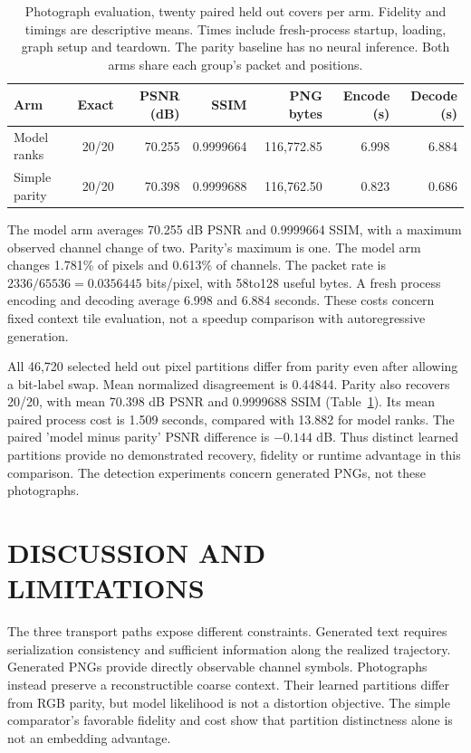 \documentclass[a4paper,twoside]{article}
\begin{document}
\begin{table}[t]
\caption{Photograph evaluation, twenty paired held out covers per arm. Fidelity and timings are descriptive means. Times include fresh-process startup, loading, graph setup and teardown. The parity baseline has no neural inference. Both arms share each group's packet and positions.}
\label{tab:cover}\centering\small
\begin{tabularx}{\textwidth}{@{}lrrrrrr@{}}
\toprule
Arm & Exact & PSNR (dB) & SSIM & PNG bytes & Encode (s) & Decode (s)\\
\midrule
Model ranks & 20/20 & 70.255 & 0.9999664 & 116,772.85 & 6.998 & 6.884\\
Simple parity & 20/20 & 70.398 & 0.9999688 & 116,762.50 & 0.823 & 0.686\\
\bottomrule
\end{tabularx}
\space
\end{table}

The model arm averages 70.255 dB PSNR and 0.9999664 SSIM, with a maximum observed channel change of two. Parity's maximum is one. The model arm changes 1.781\% of pixels and 0.613\% of channels. The packet rate is $2336/65536=0.0356445$ bits/pixel, with 58to128 useful bytes. A fresh process encoding and decoding average 6.998 and 6.884 seconds. These costs concern fixed context tile evaluation, not a speedup comparison with autoregressive generation.

All 46,720 selected held out pixel partitions differ from parity even after allowing a bit-label swap. Mean normalized disagreement is 0.44844. Parity also recovers 20/20, with mean 70.398 dB PSNR and 0.9999688 SSIM (Table~\ref{tab:cover}). Its mean paired process cost is 1.509 seconds, compared with 13.882 for model ranks. The paired 'model minus parity' PSNR difference is $-0.144$ dB. Thus distinct learned partitions provide no demonstrated recovery, fidelity or runtime advantage in this comparison. The detection experiments concern generated PNGs, not these photographs.

\space

\section{\uppercase{Discussion and Limitations}}
\label{sec:discussion}
The three transport paths expose different constraints. Generated text requires serialization consistency and sufficient information along the realized trajectory. Generated PNGs provide directly observable channel symbols. Photographs instead preserve a reconstructible coarse context. Their learned partitions differ from RGB parity, but model likelihood is not a distortion objective. The simple comparator's favorable fidelity and cost show that partition distinctness alone is not an embedding advantage.
\end{document}
